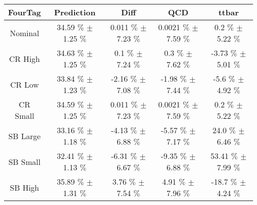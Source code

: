 \begin{footnotesize} 
\begin{tabular}{c|c|c|c|c} 
 FourTag & Prediction & Diff & QCD & ttbar \\ 
\hline\hline 
 
Nominal & 34.59 $\%$  $\pm$ 1.25 $\%$  & 0.011 $\%$  $\pm$ 7.23 $\%$  & 0.0021 $\%$  $\pm$ 7.59 $\%$  & 0.2 $\%$  $\pm$ 5.22 $\%$ \\ 
CR High & 34.63 $\%$  $\pm$ 1.25 $\%$  & 0.1 $\%$  $\pm$ 7.24 $\%$  & 0.3 $\%$  $\pm$ 7.62 $\%$  & -3.73 $\%$  $\pm$ 5.01 $\%$ \\ 
CR Low & 33.84 $\%$  $\pm$ 1.23 $\%$  & -2.16 $\%$  $\pm$ 7.08 $\%$  & -1.98 $\%$  $\pm$ 7.44 $\%$  & -5.6 $\%$  $\pm$ 4.92 $\%$ \\ 
CR Small & 34.59 $\%$  $\pm$ 1.25 $\%$  & 0.011 $\%$  $\pm$ 7.23 $\%$  & 0.0021 $\%$  $\pm$ 7.59 $\%$  & 0.2 $\%$  $\pm$ 5.22 $\%$ \\ 
SB Large & 33.16 $\%$  $\pm$ 1.18 $\%$  & -4.13 $\%$  $\pm$ 6.88 $\%$  & -5.57 $\%$  $\pm$ 7.17 $\%$  & 24.0 $\%$  $\pm$ 6.46 $\%$ \\ 
SB Small & 32.41 $\%$  $\pm$ 1.13 $\%$  & -6.31 $\%$  $\pm$ 6.67 $\%$  & -9.35 $\%$  $\pm$ 6.88 $\%$  & 53.41 $\%$  $\pm$ 7.99 $\%$ \\ 
SB High & 35.89 $\%$  $\pm$ 1.31 $\%$  & 3.76 $\%$  $\pm$ 7.54 $\%$  & 4.91 $\%$  $\pm$ 7.96 $\%$  & -18.7 $\%$  $\pm$ 4.24 $\%$ \\ 
 
\hline\hline 
\end{tabular} 
\end{footnotesize} 
\newline 

